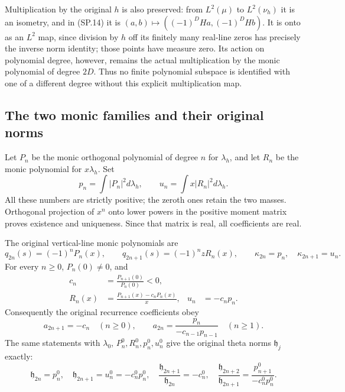 Multiplication by the original \(h\) is also preserved: from
\(L^2(\mu)\) to \(L^2(\nu_h)\) it is an isometry, and in (SP.14)
it is \((a,b)\mapsto((-1)^DH a,(-1)^DH b)\). It is onto as an
\(L^2\) map, since division by \(h\) off its finitely many real-line
zeros has precisely the inverse norm identity; those points have
measure zero. Its action on polynomial degree, however, remains
the actual multiplication by the monic polynomial of degree \(2D\).
Thus no finite polynomial subspace is identified with one of a
different degree without this explicit multiplication map.

\subsection{The two monic families and their original norms}

Let \(P_n\) be the monic orthogonal polynomial of degree \(n\)
for \(\lambda_h\), and let \(R_n\) be the monic polynomial for
\(x\lambda_h\). Set
\[
 p_n=\int|P_n|^2d\lambda_h,\qquad
 u_n=\int x|R_n|^2d\lambda_h.
 \tag{SP.17}
\]
All these numbers are strictly positive; the zeroth ones retain the
two masses. Orthogonal projection of \(x^n\) onto lower powers
in the positive moment matrix proves existence and uniqueness.
Since that matrix is real, all coefficients are real.

\begin{theorem}
The original vertical-line monic polynomials are
\[
 q_{2n}(s)=(-1)^nP_n(x),\qquad
 q_{2n+1}(s)=(-1)^nzR_n(x),\qquad
 \kappa_{2n}=p_n,\quad\kappa_{2n+1}=u_n.
 \tag{SP.18}
\]
For every \(n\ge0\), \(P_n(0)\ne0\), and
\[
 \begin{aligned}
 c_n&=\frac{P_{n+1}(0)}{P_n(0)}<0,\\
 R_n(x)&=\frac{P_{n+1}(x)-c_nP_n(x)}{x},
 &u_n&=-c_np_n.
 \end{aligned}
 \tag{SP.19}
\]
Consequently the original recurrence coefficients obey
\[
 a_{2n+1}=-c_n\quad(n\ge0),\qquad
 a_{2n}=\frac{p_n}{-c_{n-1}p_{n-1}}\quad(n\ge1).
 \tag{SP.20}
\]
The same statements with \(\lambda_0\), \(P_n^0,R_n^0,p_n^0,u_n^0\)
give the original theta norms \(\mathfrak h_j\) exactly:
\[
 \mathfrak h_{2n}=p_n^0,\quad
 \mathfrak h_{2n+1}=u_n^0=-c_n^0p_n^0,\quad
 \frac{\mathfrak h_{2n+1}}{\mathfrak h_{2n}}=-c_n^0,\quad
 \frac{\mathfrak h_{2n+2}}{\mathfrak h_{2n+1}}
       =\frac{p_{n+1}^0}{-c_n^0p_n^0}.
 \tag{SP.21}
\]
\end{theorem}

